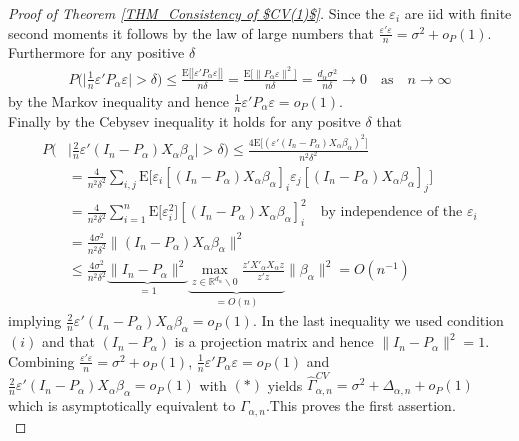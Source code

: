 \documentclass[Research_Module_ES.tex]{subfiles}
\begin{document}
\begin{proof}[Proof of Theorem \ref{THM_Consistency of $CV(1)$}]
	Since the $\varepsilon_i$ are iid with finite second moments it follows by the law of large numbers that
	$\frac{\varepsilon'\varepsilon}{n} = \sigma^2 + o_P(1)$.
	Furthermore for any positive $\delta$
	\begin{align*}
	P\biggl(\biggl|\frac{1}{n}\varepsilon'P_\alpha\varepsilon\biggr|>\delta\biggr) \le \frac{\mathrm{E}\bigl[|\varepsilon'P_\alpha\varepsilon|\bigr]}{n\delta}=\frac{\mathrm{E}\bigl[\lVert P_\alpha\varepsilon\rVert^2\bigr]}{n\delta}=\frac{d_\alpha \sigma^2}{n\delta} \to 0 \quad \textrm{as} \quad n\to \infty
	\end{align*}
	by the Markov inequality and hence $\frac{1}{n}\varepsilon'P_\alpha\varepsilon = o_P(1)$.\\
	Finally by the Cebysev inequality it holds for any positve $\delta$ that
	\begin{align*}
	P\biggl(&\biggl|\frac{2}{n}\varepsilon'(I_n-P_\alpha)X_\alpha\beta_\alpha\biggr|>\delta\biggr) \le \frac{4\mathrm{E}\bigl[(\varepsilon'(I_n-P_\alpha)X_\alpha\beta_\alpha)^2\bigr]}{n^2\delta^2}\\
	&=\frac{4}{n^2\delta^2}\sum_{i,j}\mathrm{E}\bigl[\varepsilon_i[(I_n-P_\alpha)X_\alpha\beta_\alpha]_i\varepsilon_j[(I_n-P_\alpha)X_\alpha\beta_\alpha]_j\bigr]\\
	&=\frac{4}{n^2\delta^2}\sum_{i=1}^n\mathrm{E}\bigl[\varepsilon_i^2\bigr][(I_n-P_\alpha)X_\alpha\beta_\alpha]_i^2 \quad \textrm{by independence of the $\varepsilon_i$}\\
	&=\frac{4\sigma^2}{n^2\delta^2}\lVert(I_n-P_\alpha)X_\alpha\beta_\alpha\rVert^2 \\
	&\le \frac{4\sigma^2}{n^2\delta^2} \underbrace{\lVert I_n-P_\alpha \rVert^2}_{=1} \underbrace{\max_{z\in \mathbb{R}^{d_\alpha}\backslash 0}\frac{z'X'_\alpha X_\alpha z}{z'z}}_{=O(n)} \lVert \beta_\alpha \rVert^2
	=O(n^{-1})
	\end{align*}
	implying $\frac{2}{n}\varepsilon'(I_n-P_\alpha)X_\alpha\beta_\alpha=o_P(1)$. 
	In the last inequality we used condition $(i)$ and that $(I_n-P_\alpha)$ is a projection matrix and hence $\lVert I_n-P_\alpha \rVert^2 = 1$.\\
	Combining $\frac{\varepsilon'\varepsilon}{n} = \sigma^2 + o_P(1)$, $\frac{1}{n}\varepsilon'P_\alpha\varepsilon = o_P(1)$ and $\frac{2}{n}\varepsilon'(I_n-P_\alpha)X_\alpha\beta_\alpha=o_P(1)$ with $(\ast)$ yields $\hat{\Gamma}_{\alpha,n}^{CV} = \sigma^2 + \Delta_{\alpha,n} + o_P(1)$ which is asymptotically equivalent to $\Gamma_{\alpha,n}$.This proves the first assertion.\\
	

\end{proof}
\end{document}
